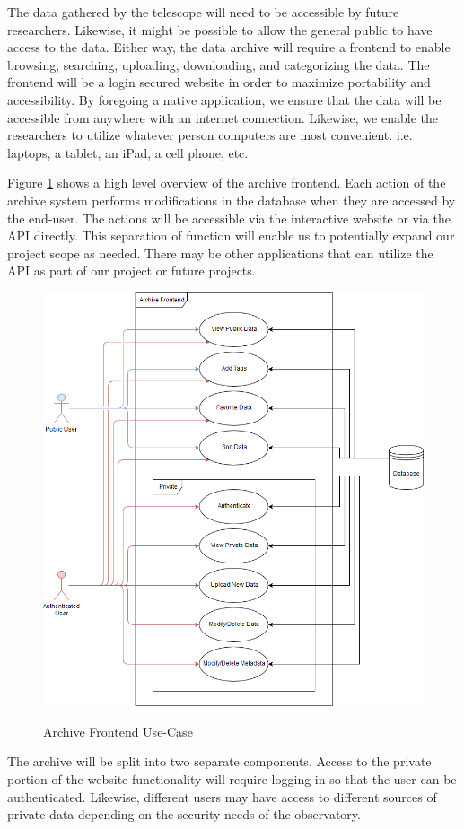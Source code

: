 \documentclass[12pt]{report}
\begin{document}
The data gathered by the telescope will need to be accessible by future researchers. Likewise, it might be possible to allow the general public to have access to the data. Either way, the data archive will require a frontend to enable browsing, searching, uploading, downloading, and categorizing the data. The frontend will be a login secured website in order to maximize portability and accessibility. By foregoing a native application, we ensure that the data will be accessible from anywhere with an internet connection. Likewise, we enable the researchers to utilize whatever person computers are most convenient. i.e. laptops, a tablet, an iPad, a cell phone, etc.

Figure \ref{fig:archiveusecase} shows a high level overview of the archive frontend. Each action of the archive system performs modifications in the database when they are accessed by the end-user. The actions will be accessible via the interactive website or via the API directly. This separation of function will enable us to potentially expand our project scope as needed. There may be other applications that can utilize the API as part of our project or future projects.

\begin{figure}[h]
	\centering
	\caption{Archive Frontend Use-Case}
	\includegraphics[width=0.75\linewidth]{frontend_use_case}
	\label{fig:archiveusecase}
\end{figure}

The archive will be split into two separate components. Access to the private portion of the website functionality will require logging-in so that the user can be authenticated. Likewise, different users may have access to different sources of private data depending on the security needs of the observatory.
\end{document}
